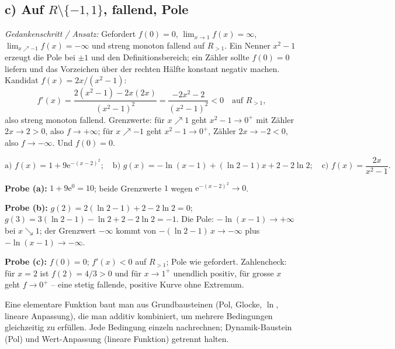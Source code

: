 \subsection*{c) Auf $R\setminus\{-1,1\}$, fallend, Pole}
\emph{Gedankenschritt / Ansatz:} Gefordert $f(0)=0$,
$\lim_{x\to1}f(x)=\infty$, $\lim_{x\nearrow-1}f(x)=-\infty$ und streng
monoton fallend auf $R_{>1}$. Ein Nenner $x^2-1$ erzeugt die Pole bei
$\pm1$ und den Definitionsbereich; ein Zähler sollte $f(0)=0$ liefern und
das Vorzeichen über der rechten Hälfte konstant negativ machen. Kandidat
$f(x)=2x/(x^2-1)$:
\begin{equation*}
  f'(x)=\frac{2(x^2-1)-2x(2x)}{(x^2-1)^2}
  =\frac{-2x^2-2}{(x^2-1)^2}<0 \quad\text{auf }R_{>1},
\end{equation*}
also streng monoton fallend. Grenzwerte: für $x\nearrow1$ geht $x^2-1\to
0^+$ mit Zähler $2x\to2>0$, also $f\to+\infty$; für $x\nearrow-1$ geht
$x^2-1\to0^+$, Zähler $2x\to-2<0$, also $f\to-\infty$. Und $f(0)=0$.

\begin{ergebnis}
\begin{equation*}
  \text{a) } f(x)=1+9\mathrm e^{-(x-2)^2};\quad
  \text{b) } g(x)=-\ln(x-1)+(\ln2-1)x+2-2\ln2;\quad
  \text{c) } f(x)=\frac{2x}{x^2-1}.
\end{equation*}
\end{ergebnis}

\begin{kontrolle}
\textbf{Probe (a):} $1+9\mathrm e^0=10$; beide Grenzwerte $1$ wegen
$\mathrm e^{-(x-2)^2}\to0$. \checkmark

\textbf{Probe (b):} $g(2)=2(\ln2-1)+2-2\ln2=0$;
$g(3)=3(\ln2-1)-\ln2+2-2\ln2=-1$. Die Pole: $-\ln(x-1)\to+\infty$ bei
$x\searrow1$; der Grenzwert $-\infty$ kommt von $-(\ln2-1)\,x\to-\infty$
plus $-\ln(x-1)\to-\infty$. \checkmark

\textbf{Probe (c):} $f(0)=0$; $f'(x)<0$ auf $R_{>1}$; Pole wie gefordert.
Zahlencheck: für $x=2$ ist $f(2)=4/3>0$ und für $x\to1^+$ unendlich
positiv, für grosse $x$ geht $f\to0^+$ -- eine stetig fallende, positive
Kurve ohne Extremum. \checkmark
\end{kontrolle}

\begin{merksatz}
Eine elementare Funktion baut man aus Grundbausteinen (Pol, Glocke,
$\ln$, lineare Anpassung), die man additiv kombiniert, um mehrere
Bedingungen gleichzeitig zu erfüllen. Jede Bedingung einzeln nachrechnen;
Dynamik-Baustein (Pol) und Wert-Anpassung (lineare Funktion) getrennt
halten.
\end{merksatz}

